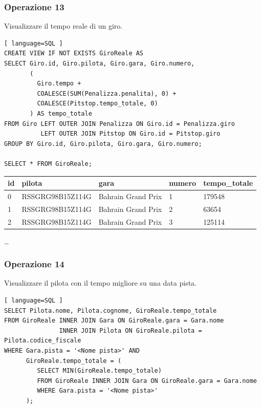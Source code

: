 \documentclass[11pt]{article}
\begin{document}
\subsubsection{Operazione 13}
Visualizzare il tempo reale di un giro.
\begin{lstlisting}[ language=SQL ]
CREATE VIEW IF NOT EXISTS GiroReale AS
SELECT Giro.id, Giro.pilota, Giro.gara, Giro.numero, 
       (
         Giro.tempo + 
         COALESCE(SUM(Penalizza.penalita), 0) + 
         COALESCE(Pitstop.tempo_totale, 0)
       ) AS tempo_totale
FROM Giro LEFT OUTER JOIN Penalizza ON Giro.id = Penalizza.giro
          LEFT OUTER JOIN Pitstop ON Giro.id = Pitstop.giro
GROUP BY Giro.id, Giro.pilota, Giro.gara, Giro.numero;

SELECT * FROM GiroReale;
\end{lstlisting}

\begin{center}
    \begin{table}[H]
        \centering
        \begin{tabular}{|l|l|l|l|l|}
            \hline
            \textbf{id} & \textbf{pilota} & \textbf{gara} & \textbf{numero} & \textbf{tempo\_totale} \\ \hline
            0 & RSSGRG98B15Z114G & Bahrain Grand Prix & 1 & 179548 \\ \hline
            1 & RSSGRG98B15Z114G & Bahrain Grand Prix & 2 & 63654 \\ \hline
            2 & RSSGRG98B15Z114G & Bahrain Grand Prix & 3 & 125114 \\ \hline
        \end{tabular}
    \end{table}
    \vspace*{-1em}
    \dots
\end{center}


\newpage
\subsubsection{Operazione 14}
Visualizzare il pilota con il tempo migliore su una data pista.
\begin{lstlisting}[ language=SQL ]
SELECT Pilota.nome, Pilota.cognome, GiroReale.tempo_totale
FROM GiroReale INNER JOIN Gara ON GiroReale.gara = Gara.nome
               INNER JOIN Pilota ON GiroReale.pilota = Pilota.codice_fiscale
WHERE Gara.pista = '<Nome pista>' AND
      GiroReale.tempo_totale = (
         SELECT MIN(GiroReale.tempo_totale)
         FROM GiroReale INNER JOIN Gara ON GiroReale.gara = Gara.nome
         WHERE Gara.pista = '<Nome pista>'
      );
\end{lstlisting}
\end{document}
